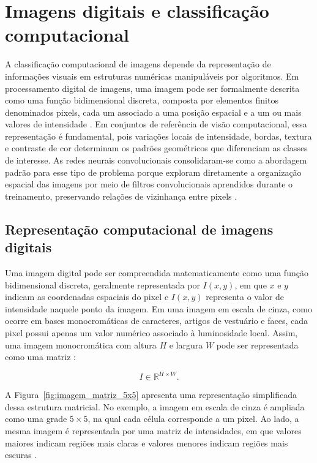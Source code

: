 \documentclass[
    12pt,
    openright,
    oneside,
    a4paper,
    english,
    brazil
]{abntex2}
\begin{document}
\section{Imagens digitais e classificação computacional}

A classificação computacional de imagens depende da representação de informações visuais em estruturas numéricas manipuláveis por algoritmos. Em processamento digital de imagens, uma imagem pode ser formalmente descrita como uma função bidimensional discreta, composta por elementos finitos denominados pixels, cada um associado a uma posição espacial e a um ou mais valores de intensidade \cite{gonzalez2008digital}. Em conjuntos de referência de visão computacional, essa representação é fundamental, pois variações locais de intensidade, bordas, textura e contraste de cor determinam os padrões geométricos que diferenciam as classes de interesse. As redes neurais convolucionais consolidaram-se como a abordagem padrão para esse tipo de problema porque exploram diretamente a organização espacial das imagens por meio de filtros convolucionais aprendidos durante o treinamento, preservando relações de vizinhança entre pixels \cite{LeCun2015}.

\subsection{Representação computacional de imagens digitais}

Uma imagem digital pode ser compreendida matematicamente como uma função bidimensional discreta, geralmente representada por \(I(x,y)\), em que \(x\) e \(y\) indicam as coordenadas espaciais do pixel e \(I(x,y)\) representa o valor de intensidade naquele ponto da imagem. Em uma imagem em escala de cinza, como ocorre em bases monocromáticas de caracteres, artigos de vestuário e faces, cada pixel possui apenas um valor numérico associado à luminosidade local. Assim, uma imagem monocromática com altura \(H\) e largura \(W\) pode ser representada como uma matriz \cite{gonzalez2008digital}:

\begin{equation}
\label{eq:imagem_cinza_matriz}
I \in \mathbb{R}^{H \times W}.
\end{equation}

A Figura~\ref{fig:imagem_matriz_5x5} apresenta uma representação simplificada dessa estrutura matricial. No exemplo, a imagem em escala de cinza é ampliada como uma grade \(5 \times 5\), na qual cada célula corresponde a um pixel. Ao lado, a mesma imagem é representada por uma matriz de intensidades, em que valores maiores indicam regiões mais claras e valores menores indicam regiões mais escuras \cite{gonzalez2008digital}.
\end{document}
